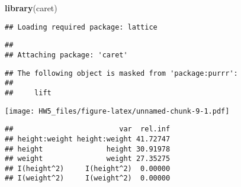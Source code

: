 \documentclass[]{article}
\newenvironment{Shaded}{\begin{snugshade}}{\end{snugshade}}
\newcommand{\DataTypeTok}[1]{\textcolor[rgb]{0.13,0.29,0.53}{#1}}
\newcommand{\DecValTok}[1]{\textcolor[rgb]{0.00,0.00,0.81}{#1}}
\newcommand{\FloatTok}[1]{\textcolor[rgb]{0.00,0.00,0.81}{#1}}
\newcommand{\KeywordTok}[1]{\textcolor[rgb]{0.13,0.29,0.53}{\textbf{#1}}}
\newcommand{\NormalTok}[1]{#1}
\newcommand{\OperatorTok}[1]{\textcolor[rgb]{0.81,0.36,0.00}{\textbf{#1}}}
\newcommand{\OtherTok}[1]{\textcolor[rgb]{0.56,0.35,0.01}{#1}}
\newcommand{\StringTok}[1]{\textcolor[rgb]{0.31,0.60,0.02}{#1}}
\begin{document}
\begin{Shaded}
\begin{Highlighting}[]
\KeywordTok{library}\NormalTok{(caret)}
\end{Highlighting}
\end{Shaded}

\begin{verbatim}
## Loading required package: lattice
\end{verbatim}

\begin{verbatim}
## 
## Attaching package: 'caret'
\end{verbatim}

\begin{verbatim}
## The following object is masked from 'package:purrr':
## 
##     lift
\end{verbatim}

\begin{Shaded}
\end{Shaded}

\texttt{[image: HW5\_files/figure-latex/unnamed-chunk-9-1.pdf]}

\begin{verbatim}
##                         var  rel.inf
## height:weight height:weight 41.72747
## height               height 30.91978
## weight               weight 27.35275
## I(height^2)     I(height^2)  0.00000
## I(weight^2)     I(weight^2)  0.00000
\end{verbatim}
\end{document}
